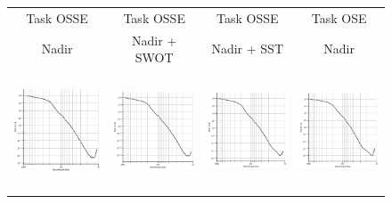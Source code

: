 \begin{figure}[t!]
\small
\begin{center}
\setlength{\tabcolsep}{1pt}
\begin{tabular}{cccc}
\hspace{3mm} Task OSSE & 
 Task OSSE & 
\hspace{-10mm} Task OSSE & 
\hspace{-10mm}Task OSE \\
\hspace{3mm}  Nadir & 
 Nadir + SWOT & 
\hspace{-10mm} Nadir + SST & 
\hspace{-10mm}Nadir \\
\includegraphics[trim={0 0 0 0},clip, width=3.70cm,height=3.5cm]{content/figures/fourdvarnet_figs/osse_gf_nadir_isotrop.png} &
\includegraphics[trim={18mm 0 0 0},clip, width=3.3cm,height=3.5cm]{content/figures/fourdvarnet_figs/osse_gf_nadirswot_isotrop.png} &
\hspace{-5mm}\includegraphics[trim={18mm 0 0 0},clip, width=3.3cm,height=3.5cm]{content/figures/fourdvarnet_figs/osse_gf_nadir_sst_isotrop.png} &
\hspace{-10mm}\includegraphics[trim={18mm 0 0 0},clip,width=3.3cm,height=3.5cm]{content/figures/fourdvarnet_figs/ose_gf_isotrop.png} \\

\end{tabular}
\end{center}
\end{figure}
